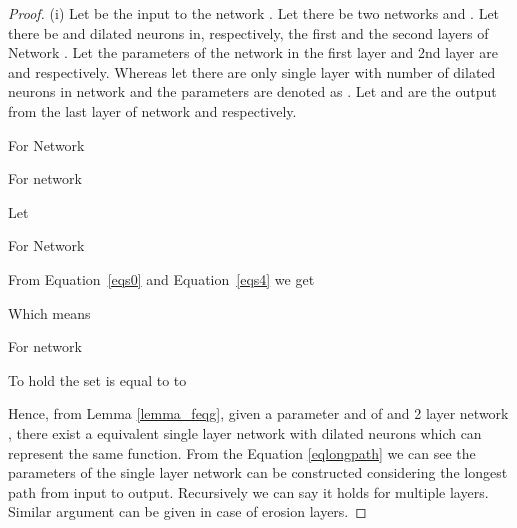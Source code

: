 \documentclass[12pt]{article}
\begin{document}
\begin{proof}
(i) Let  be the input to the network . Let there be two networks  and . Let there be  and  dilated neurons in, respectively, the first and the second layers of Network . Let the parameters of the network  in the first layer and 2nd layer are   and   respectively. Whereas let  there are only  single layer with   number of  dilated neurons in network  and the parameters are denoted as  .  Let    and  are the output from the last layer of network  and  respectively.

 
For Network 


For network 


Let



For Network 


From Equation~\ref{eqs0} and Equation~\ref{eqs4} we get 




Which means 



For network  


To hold  the  set   is equal to  to    


Hence, from Lemma \ref{lemma_feqg}, given a parameter   and  of and 2 layer network , there exist a equivalent single layer network  with dilated neurons  which can represent the same  function. From the Equation \ref{eqlongpath} we can see the parameters of the single layer network can be constructed considering the longest path from input to output. Recursively we can say it holds for multiple layers. Similar argument can be given in case of erosion layers.


\end{proof}
\end{document}
